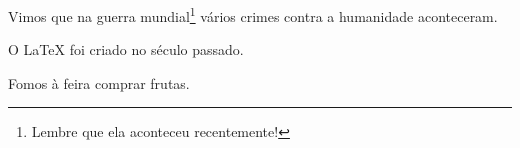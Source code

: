 \documentclass[12pt,a4paper]{memoir}
\begin{document}
\dotfill

\vspace*{\fill}

Vimos que na guerra mundial\footnote{Lembre que ela aconteceu recentemente!}
vários crimes contra a humanidade aconteceram.

O \LaTeX{} foi criado no século
passado.

Fomos à feira comprar frutas.

\vspace*{\fill}

\dotfill
\end{document}
